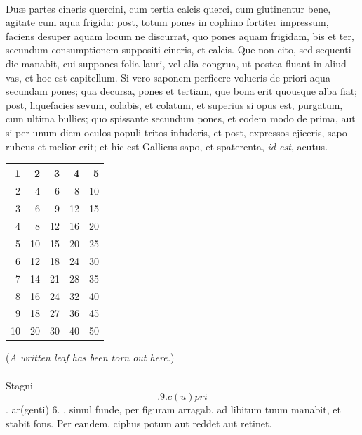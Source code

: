 \documentclass[a4paper, 11pt, oneside, polutonikogreek, italian]{article}
\newcommand*\svgaaa{}
\begin{document}
\paragraph{}
Duæ partes cineris quercini, cum tertia calcis querci, cum glutinentur bene, agitate cum aqua frigida: post, totum pones in cophino fortiter impressum, faciens desuper aquam locum ne discurrat, quo pones aquam frigidam, bis et ter, secundum consumptionem suppositi cineris, et calcis. Que non cito, sed sequenti die manabit, cui suppones folia lauri, vel alia congrua, ut postea fluant in aliud vas, et hoc est capitellum. Si vero saponem perficere volueris de priori aqua secundam pones; qua decursa, pones et tertiam, que bona erit quousque alba fiat; post, liquefacies sevum, colabis, et colatum, et superius si opus est, purgatum, cum ultima bullies; quo spissante secundum pones, et eodem modo de prima, aut si per unum diem oculos populi tritos infuderis, et post, expressos ejiceris, sapo rubeus et melior erit; et hic est Gallicus sapo, et spaterenta, \emph{id est}, acutus.

\begin{table}[H]
    \centering
    \small\bfseries
    \begin{tabular}{|r|r|r|r|r|}
    \hline
        1 & 2 & 3 & 4 & 5 \\ \hline
        2 & 4 & 6 & 8 & 10 \\ \hline
        3 & 6 & 9 & 12 & 15 \\ \hline
        4 & 8 & 12 & 16 & 20 \\ \hline
        5 & 10 & 15 & 20 & 25 \\ \hline
        6 & 12 & 18 & 24 & 30 \\ \hline
        7 & 14 & 21 & 28 & 35 \\ \hline
        8 & 16 & 24 & 32 & 40 \\ \hline
        9 & 18 & 27 & 36 & 45 \\ \hline
        10 & 20 & 30 & 40 & 50 \\ \hline
    \end{tabular}
\end{table}
\begin{center}
(\emph{A written leaf has been torn out here.})
\end{center}
\paragraph{}
Stagni $\svgaaa$. 9. c(u)pri $\svgaaa$. ar(genti) 6. $\svgaaa$. simul funde, per figuram arragab. ad libitum tuum manabit, et stabit fons. Per eandem, ciphus potum aut reddet aut retinet.
\end{document}
